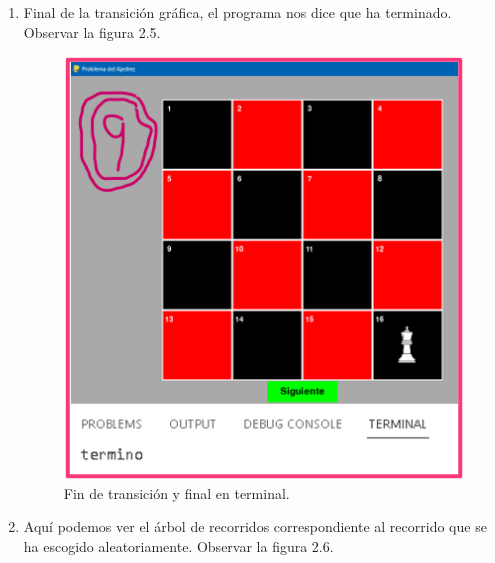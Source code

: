 \begin{enumerate}
\newpage
\item Final de la transición gráfica, el programa nos dice que ha terminado. Observar la figura 2.5.

\begin{figure}[h]
    \begin{center}
    \includegraphics[width=0.7\linewidth]{Images/Cap4.png}
    \end{center}
\caption{Fin de transición y final en terminal.}
\label{fig:imagen}
\end{figure}

\newpage
\item Aquí podemos ver el árbol de recorridos correspondiente al recorrido que se ha escogido aleatoriamente. Observar la figura 2.6.


\end{enumerate}
